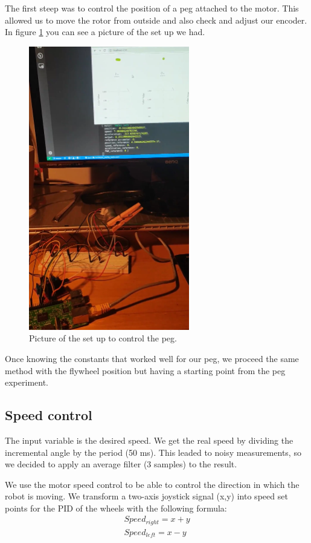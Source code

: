 The first steep was to control the position of a peg attached to the motor.
This allowed us to move the rotor from outside and also check and adjust our encoder.
In figure \ref{fig: control peg} you can see a picture of the set up we had.

\begin{figure}[H]
    \centering
    \includegraphics[width=7cm]{img/peg.png}
    \caption{Picture of the set up to control the peg.}
    \label{fig: control peg}
\end{figure}

Once knowing the constants that worked well for our peg,
we proceed the same method with the flywheel position but having a
starting point from the peg experiment.


\subsection{Speed control}
The input variable is the desired speed. We get the real speed by dividing the incremental angle
by the period (50 ms). This leaded to noisy measurements, so we decided to apply an average filter (3 samples) to
the result.

We use the motor speed control to be able to control the direction in which the robot is moving.
We transform a two-axis joystick signal (x,y) into speed set points for the PID of the wheels
 with the following formula:
\begin{equation}
    \begin{split}
    Speed_{right} = x + y \\
    Speed_{left} = x - y    
    \end{split}
\end{equation}
